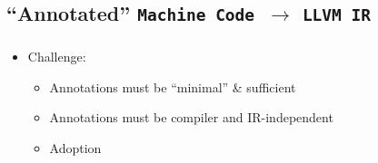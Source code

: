 \documentclass[mathserif,10pt]{beamer}
\newcommand{\cmt}[1]{}
\newcommand{\LIR}{{\tt LLVM IR}}
\newcommand{\MC}{{\tt Machine Code}}
\begin{document}
  \subsection{``Annotated'' \MC \ $\rightarrow$ \LIR}
  \frame
  {
    \frametitle{\subsecname}
    \begin{itemize}
      \item Challenge: 
        \begin{itemize}
          \item Annotations must be ``minimal'' \& sufficient
          \item Annotations must be compiler and IR-independent
          \item Adoption
        \end{itemize}
    \end{itemize}

\cmt{ Another challenge is that the annotations should be compiler- and
  IR-independent, e.g., a non-LLVM commercial compiler such as Windows Visual
    C++ or Intel’s ICC should be able to produce them 

    what is the minimal information sufficient to reconstruct LLVM IR, so that
    redundant information is not encoded. A third question is how to encode the
    information compactly on native code, so that it does not blow up the size
    of executables.  1.2.3
    
    * Add another bullet
    here saying that we will learn from our experience with the first approach
    before we decide what the annotations need to be
}

  }
\end{document}
